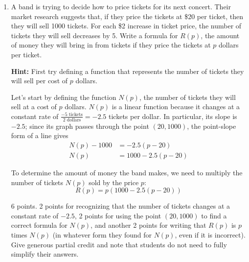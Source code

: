 \documentclass[10pt]{article}
\DeclareRobustCommand{\numbox}[1]{\tikz[overlay, baseline=-10pt, trapezium stretches=true] \node[trapezium, trapezium left angle=45, trapezium right angle=90, shape border rotate=90, anchor=north, text depth=1cm, inner ysep=8pt, fill=color1, text=white, font=\Large]{#1}; \,}
\begin{document}
\begin{enumerate}[leftmargin=*, label=\numbox{\arabic*}]
\item
    \begin{problem}
        A band is trying to decide how to price tickets for its next concert.
        Their market research suggests that, if they price the tickets at \$20
        per ticket, then they will sell 1000 tickets.  For each \$2 increase
        in ticket price, the number of tickets they will sell decreases by 5.
        Write a formula for $R(p)$, the amount of money they will bring in from tickets if
        they price the tickets at $p$ dollars per ticket.
        \vspace{1ex}
        
        \textbf{Hint:} First try defining a function that represents the number of tickets they will sell per cost of $p$ dollars.
    \end{problem}

    \begin{solution}
        Let's start by defining the function $N(p)$, the number of tickets they will sell at a cost of $p$ dollars.
        $N(p)$ is a linear function because it changes at a constant rate of
        $\frac{-5 \text{ tickets}}{2 \text{ dollars}} = -2.5$ tickets per
        dollar.  In particular, its slope is $-2.5$; since its graph passes
        through the point $(20, 1000)$, the point-slope form of a line gives
        \begin{align*}
            N(p) - 1000 &= - 2.5 (p - 20) \\
            N(p) &= 1000 - 2.5 (p - 20)
        \end{align*}

        To determine the amount of money the band makes, we need to multiply the number of tickets $N(p)$ sold by the price $p$:
            $$\boxed{R(p) = p(1000 - 2.5(p-20))}$$
    \end{solution}
    \begin{grading}
    6 points. 2 points for recognizing that the number of tickets changes at a constant rate of $-2.5$, 2 points for using the point $(20, 1000)$ to find a correct formula for $N(p)$, and another 2 points for writing that $R(p)$ is $p$ times $N(p)$ (in whatever form they found for $N(p)$, even if it is incorrect). Give generous partial credit and note that students do not need to fully simplify their answers. 
    \end{grading}
\end{enumerate}
\end{document}
